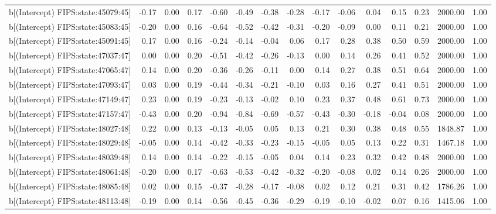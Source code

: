 \begin{table}[ht]
\begin{tabular}{rrrrrrrrrrrrrrr}
  b[(Intercept) FIPS:state:45079:45] & -0.17 & 0.00 & 0.17 & -0.60 & -0.49 & -0.38 & -0.28 & -0.17 & -0.06 & 0.04 & 0.15 & 0.23 & 2000.00 & 1.00 \\ 
  b[(Intercept) FIPS:state:45083:45] & -0.20 & 0.00 & 0.16 & -0.64 & -0.52 & -0.42 & -0.31 & -0.20 & -0.09 & 0.00 & 0.11 & 0.21 & 2000.00 & 1.00 \\ 
  b[(Intercept) FIPS:state:45091:45] & 0.17 & 0.00 & 0.16 & -0.24 & -0.14 & -0.04 & 0.06 & 0.17 & 0.28 & 0.38 & 0.50 & 0.59 & 2000.00 & 1.00 \\ 
  b[(Intercept) FIPS:state:47037:47] & 0.00 & 0.00 & 0.20 & -0.51 & -0.42 & -0.26 & -0.13 & 0.00 & 0.14 & 0.26 & 0.41 & 0.52 & 2000.00 & 1.00 \\ 
  b[(Intercept) FIPS:state:47065:47] & 0.14 & 0.00 & 0.20 & -0.36 & -0.26 & -0.11 & 0.00 & 0.14 & 0.27 & 0.38 & 0.51 & 0.64 & 2000.00 & 1.00 \\ 
  b[(Intercept) FIPS:state:47093:47] & 0.03 & 0.00 & 0.19 & -0.44 & -0.34 & -0.21 & -0.10 & 0.03 & 0.16 & 0.27 & 0.41 & 0.51 & 2000.00 & 1.00 \\ 
  b[(Intercept) FIPS:state:47149:47] & 0.23 & 0.00 & 0.19 & -0.23 & -0.13 & -0.02 & 0.10 & 0.23 & 0.37 & 0.48 & 0.61 & 0.73 & 2000.00 & 1.00 \\ 
  b[(Intercept) FIPS:state:47157:47] & -0.43 & 0.00 & 0.20 & -0.94 & -0.84 & -0.69 & -0.57 & -0.43 & -0.30 & -0.18 & -0.04 & 0.08 & 2000.00 & 1.00 \\ 
  b[(Intercept) FIPS:state:48027:48] & 0.22 & 0.00 & 0.13 & -0.13 & -0.05 & 0.05 & 0.13 & 0.21 & 0.30 & 0.38 & 0.48 & 0.55 & 1848.87 & 1.00 \\ 
  b[(Intercept) FIPS:state:48029:48] & -0.05 & 0.00 & 0.14 & -0.42 & -0.33 & -0.23 & -0.15 & -0.05 & 0.05 & 0.13 & 0.22 & 0.31 & 1467.18 & 1.00 \\ 
  b[(Intercept) FIPS:state:48039:48] & 0.14 & 0.00 & 0.14 & -0.22 & -0.15 & -0.05 & 0.04 & 0.14 & 0.23 & 0.32 & 0.42 & 0.48 & 2000.00 & 1.00 \\ 
  b[(Intercept) FIPS:state:48061:48] & -0.20 & 0.00 & 0.17 & -0.63 & -0.53 & -0.42 & -0.32 & -0.20 & -0.08 & 0.02 & 0.14 & 0.26 & 2000.00 & 1.00 \\ 
  b[(Intercept) FIPS:state:48085:48] & 0.02 & 0.00 & 0.15 & -0.37 & -0.28 & -0.17 & -0.08 & 0.02 & 0.12 & 0.21 & 0.31 & 0.42 & 1786.26 & 1.00 \\ 
  b[(Intercept) FIPS:state:48113:48] & -0.19 & 0.00 & 0.14 & -0.56 & -0.45 & -0.36 & -0.29 & -0.19 & -0.10 & -0.02 & 0.07 & 0.16 & 1415.06 & 1.00 \\ 

\end{tabular}
\end{table}
